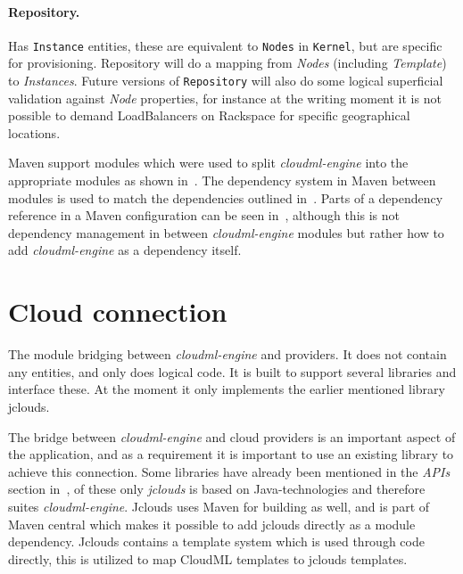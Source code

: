 \paragraph{Repository.} 

Has \texttt{Instance} entities, these are equivalent to \texttt{Nodes} in \texttt{Kernel},
but are specific for provisioning. Repository will do a mapping from \emph{Nodes} (including \emph{Template})
to \emph{Instances}. Future versions of \texttt{Repository} will also do some logical superficial validation
against \emph{Node} properties, for instance at the writing moment it is not possible to 
demand LoadBalancers on Rackspace for specific geographical locations.



Maven support modules which were used to split \emph{cloudml-engine} into the appropriate 
modules as shown in~. 
The dependency system in Maven between modules is used to match the dependencies outlined in~.
Parts of a dependency reference in a Maven configuration can be seen in~,
although this is not dependency management in between \emph{cloudml-engine} modules but rather
how to add \emph{cloudml-engine} as a dependency itself.

\section{Cloud connection}

The module bridging between \emph{cloudml-engine} and providers.
It does not contain any entities, and only does logical code. 
It is built to support several libraries and interface these. At the moment it only implements the earlier
mentioned library jclouds.

The bridge between \emph{cloudml-engine} and cloud providers is an important aspect of the application, 
and as a requirement it is important to use an existing library to achieve this connection.
Some libraries have already been mentioned in the \emph{APIs} section in~,
of these only \emph{jclouds} is based on Java-technologies and therefore suites \emph{cloudml-engine}.
Jclouds uses Maven for building as well, and is part of Maven central which makes 
it possible to add jclouds directly as a module dependency.
Jclouds contains a template system which is used through code directly, this is utilized 
to map CloudML templates to jclouds templates.

